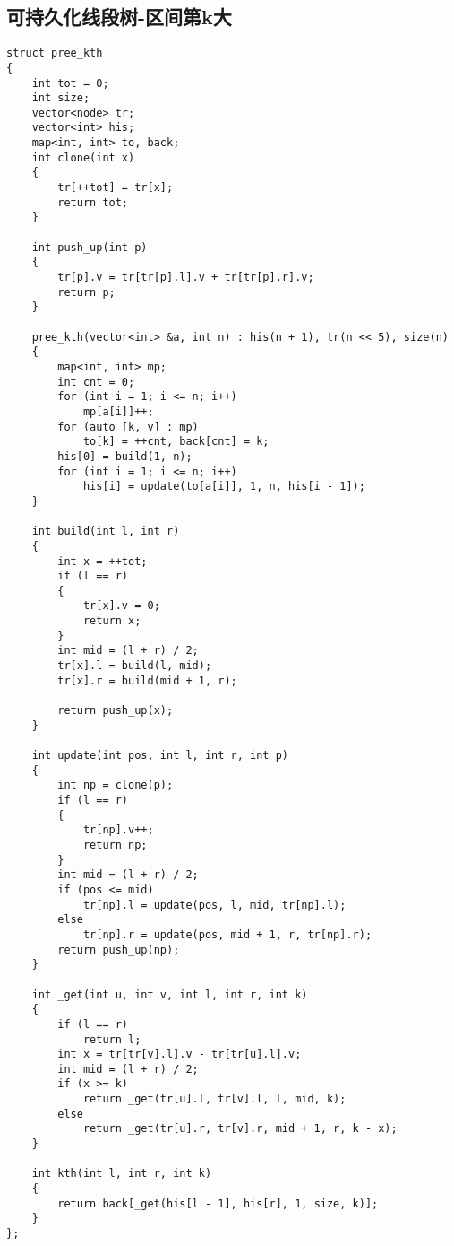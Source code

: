 \documentclass[]{article}
\begin{document}
\hypertarget{ux53efux6301ux4e45ux5316ux7ebfux6bb5ux6811-ux533aux95f4ux7b2ckux5927}{%
\subsection{可持久化线段树-区间第k大}\label{ux53efux6301ux4e45ux5316ux7ebfux6bb5ux6811-ux533aux95f4ux7b2ckux5927}}

\begin{verbatim}
struct pree_kth
{
    int tot = 0;
    int size;
    vector<node> tr;
    vector<int> his;
    map<int, int> to, back;
    int clone(int x)
    {
        tr[++tot] = tr[x];
        return tot;
    }

    int push_up(int p)
    {
        tr[p].v = tr[tr[p].l].v + tr[tr[p].r].v;
        return p;
    }

    pree_kth(vector<int> &a, int n) : his(n + 1), tr(n << 5), size(n)
    {
        map<int, int> mp;
        int cnt = 0;
        for (int i = 1; i <= n; i++)
            mp[a[i]]++;
        for (auto [k, v] : mp)
            to[k] = ++cnt, back[cnt] = k;
        his[0] = build(1, n);
        for (int i = 1; i <= n; i++)
            his[i] = update(to[a[i]], 1, n, his[i - 1]);
    }

    int build(int l, int r)
    {
        int x = ++tot;
        if (l == r)
        {
            tr[x].v = 0;
            return x;
        }
        int mid = (l + r) / 2;
        tr[x].l = build(l, mid);
        tr[x].r = build(mid + 1, r);

        return push_up(x);
    }

    int update(int pos, int l, int r, int p)
    {
        int np = clone(p);
        if (l == r)
        {
            tr[np].v++;
            return np;
        }
        int mid = (l + r) / 2;
        if (pos <= mid)
            tr[np].l = update(pos, l, mid, tr[np].l);
        else
            tr[np].r = update(pos, mid + 1, r, tr[np].r);
        return push_up(np);
    }

    int _get(int u, int v, int l, int r, int k)
    {
        if (l == r)
            return l;
        int x = tr[tr[v].l].v - tr[tr[u].l].v;
        int mid = (l + r) / 2;
        if (x >= k)
            return _get(tr[u].l, tr[v].l, l, mid, k);
        else
            return _get(tr[u].r, tr[v].r, mid + 1, r, k - x);
    }

    int kth(int l, int r, int k)
    {
        return back[_get(his[l - 1], his[r], 1, size, k)];
    }
};

\end{verbatim}
\end{document}
